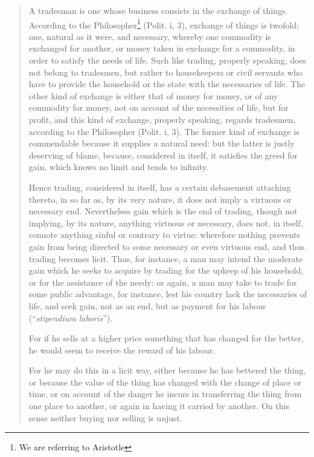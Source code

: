                 \begin{quote}
                    A tradesman is one whose business consists in the exchange of things. According to the Philosopher\footnote{We are referring to Aristotle} (Polit. i, 3), exchange of things is twofold; one, natural as it were, and necessary, whereby one commodity is exchanged for another, or money taken in exchange for a commodity, in order to satisfy the needs of life. Such like trading, properly speaking, does not belong to tradesmen, but rather to housekeepers or civil servants who have to provide the household or the state with the necessaries of life. The other kind of exchange is either that of money for money, or of any commodity for money, not on account of the necessities of life, but for profit, and this kind of exchange, properly speaking, regards tradesmen, according to the Philosopher (Polit. i, 3). The former kind of exchange is commendable because it supplies a natural need: but the latter is justly deserving of blame, because, considered in itself, it satisfies the greed for gain, which knows no limit and tends to infinity.
                    
                    Hence trading, considered in itself, has a certain debasement attaching thereto, in so far as, by its very nature, it does not imply a virtuous or necessary end. Nevertheless gain which is the end of trading, though not implying, by its nature, anything virtuous or necessary, does not, in itself, connote anything sinful or contrary to virtue: wherefore nothing prevents gain from being directed to some necessary or even virtuous end, and thus trading becomes licit. Thus, for instance, a man may intend the moderate gain which he seeks to acquire by trading for the upkeep of his household, or for the assistance of the needy: or again, a man may take to trade for some public advantage, for instance, lest his country lack the necessaries of life, and seek gain, not as an end, but as payment for his labour (``\textit{stipendium laboris}'').

                    For if he sells at a higher price something that has changed for the better, he would seem to receive the reward of his labour.

                    For he may do this in a licit way, either because he has bettered the thing, or because the value of the thing has changed with the change of place or time, or on account of the danger he incurs in transferring the thing from one place to another, or again in having it carried by another. On this sense neither buying nor selling is unjust.
                \end{quote}

